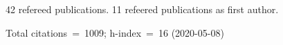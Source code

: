 42 refereed publications. 11 refeered publications as first author.

Total citations~=~1009; h-index~=~16 (2020-05-08)